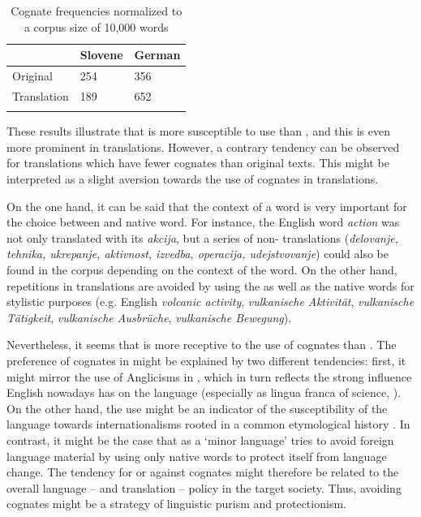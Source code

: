 \documentclass[output=paper]{LSP/langsci}
\begin{document}
\begin{table}
\caption{Cognate frequencies normalized to a corpus size of 10,000 words}
\label{hansenschirraetal:tab:1}
\begin{tabularx}{\textwidth}{XXX}
\lsptoprule
            &  {Slovene}    &  {German}    \\ \midrule
Original    & 254       & 356       \\
Translation & 189       & 652       \\
\lspbottomrule
\end{tabularx}
\end{table}

\newpage 
These results illustrate that  is more susceptible to  use than , and this is even more prominent in translations. However, a contrary tendency can be observed for  translations which have fewer cognates than  original texts. This might be interpreted as a slight aversion towards the use of cognates in  translations.

On the one hand, it can be said that the context of a word is very important for the choice between  and native word. For instance, the English word \textit{action} was not only translated with its   \textit{akcija}, but a series of non- translations (\textit{delovanje, tehnika, ukrepanje, aktivnost, izvedba, operacija, udejstvovanje}) could also be found in the corpus depending on the context of the word. On the other hand, repetitions in translations are avoided by using the  as well as the native words for stylistic purposes (e.g. English \textit{volcanic activity},  \textit{vulkanische Aktivität}, \textit{vulkanische Tätigkeit}, \textit{vulkanische Ausbrüche},\textit{ vulkanische Bewegung}).

Nevertheless, it seems that  is more receptive to the use of cognates than . The preference of cognates in  might be explained by two different tendencies: first, it might mirror the use of Anglicisms in , which in turn reflects the strong influence English nowadays has on the  language (especially as lingua franca of science, \citealt{Ammon2001}). On the other hand, the  use might be an indicator of the susceptibility of the  language towards internationalisms rooted in a common etymological history \citep{Braunetal2003}. In contrast, it might be the case that  as a `minor language' tries to avoid foreign language material by using only native words to protect itself from language change. The tendency for or against cognates might therefore be related to the overall language – and translation – policy in the target society. Thus, avoiding cognates might be a strategy of linguistic purism and protectionism. 
\end{document}
